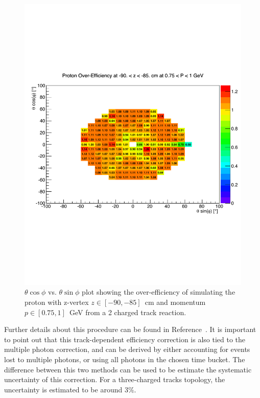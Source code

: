 \begin{v2}
\begin{figure}[htpb]\begin{center}
\includegraphics[width=1.1 \figwidth,height=\hfigheight]{figures/xsec/Proton_Eff.pdf}
\caption{\label{fig:ProtonEff} $\theta \cos\phi$ vs. $\theta \sin\phi$ plot showing the over-efficiency of simulating the proton with z-vertex $z \in [-90,-85]$~cm and momentum $p \in [0.75,1]$~GeV from a 2 charged track reaction.}
\end{center}\end{figure}


Further details about this procedure can be found in Reference~\cite{clas.thesis.kunkel}. It is important to point out that this track-dependent efficiency correction is also tied to the multiple photon correction, and can be derived by either accounting for  events lost to multiple photons, or using all photons in the chosen time bucket. The difference between this two methods can be used to be estimate the systematic uncertainty of this correction. For a three-charged tracks topology, the uncertainty is estimated to be around $3 \%$.
\end{v2}



